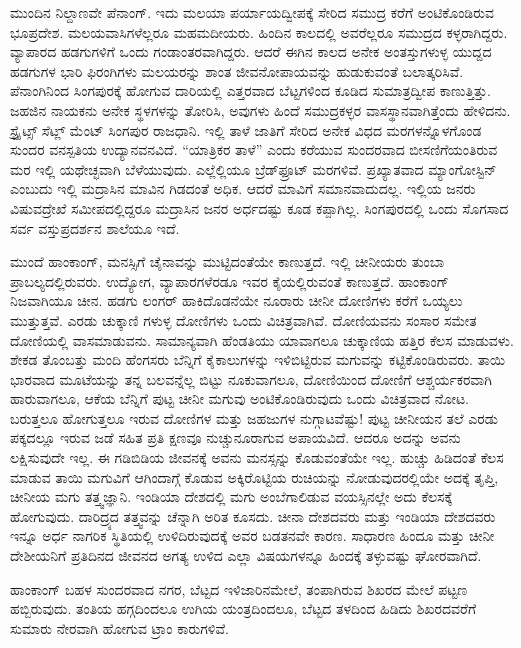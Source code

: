 ಮುಂದಿನ ನಿಲ್ದಾಣವೇ ಪೆನಾಂಗ್. ಇದು ಮಲಯಾ ಪರ್ಯಾಯದ್ವೀಪಕ್ಕೆ ಸೇರಿದ ಸಮುದ್ರ ಕರೆಗೆ ಅಂಟಿಕೊಂಡಿರುವ ಭೂಪ್ರದೇಶ. ಮಲಯವಾಸಿಗಳೆಲ್ಲರೂ ಮಹಮದೀಯರು. ಹಿಂದಿನ ಕಾಲದಲ್ಲಿ ಅವರೆಲ್ಲರೂ ಸಮುದ್ರದ ಕಳ್ಳರಾಗಿದ್ದರು. ವ್ಯಾಪಾರದ ಹಡಗುಗಳಿಗೆ ಒಂದು ಗಂಡಾಂತರವಾಗಿದ್ದರು. ಆದರೆ ಈಗಿನ ಕಾಲದ ಅನೇಕ ಅಂತಸ್ತುಗಳುಳ್ಳ ಯುದ್ದದ ಹಡಗುಗಳ ಭಾರಿ ಫಿರಂಗಿಗಳು ಮಲಯರನ್ನು ಶಾಂತ ಜೀವನೋಪಾಯವನ್ನು ಹುಡುಕುವಂತೆ ಬಲಾತ್ಕರಿಸಿವೆ. ಪೆನಾಂಗಿನಿಂದ ಸಿಂಗಪುರಕ್ಕೆ ಹೋಗುವ ದಾರಿಯಲ್ಲಿ ಎತ್ತರವಾದ ಬೆಟ್ಟಗಳಿಂದ ಕೂಡಿದ ಸುಮಾತ್ರದ್ವೀಪ ಕಾಣುತ್ತಿತ್ತು. ಜಹಜಿನ ನಾಯಕನು ಅನೇಕ ಸ್ಥಳಗಳನ್ನು ತೋರಿಸಿ, ಅವುಗಳು ಹಿಂದೆ ಸಮುದ್ರಕಳ್ಳರ ವಾಸಸ್ಥಾನವಾಗಿತ್ತೆಂದು ಹೇಳಿದನು. ಸ್ಟ್ರೈಟ್ಸ್ ಸೆಟ್ಲ್ ಮೆಂಟ್  ಸಿಂಗಪುರ ರಾಜಧಾನಿ. ಇಲ್ಲಿ ತಾಳೆ ಜಾತಿಗೆ ಸೇರಿದ ಅನೇಕ ವಿಧದ ಮರಗಳನ್ನೊಳಗೊಂಡ ಸುಂದರ ವನಸ್ಪತಿಯ ಉದ್ಯಾನವನವಿದೆ. “ಯಾತ್ರಿಕರ ತಾಳೆ” ಎಂದು ಕರೆಯುವ ಸುಂದರವಾದ ಬೀಸಣಿಗೆಯಂತಿರುವ ಮರ ಇಲ್ಲಿ ಯಥೇಚ್ಛವಾಗಿ ಬೆಳೆಯುವುದು. ಎಲ್ಲೆಲ್ಲಿಯೂ ಬ್ರೆಡ್‌ಫ್ರೂಟ್ ಮರಗಳಿವೆ. ಪ್ರಖ್ಯಾತವಾದ ಮ್ಯಾಂಗೋಸ್ಟಿನ್ ಎಂಬುದು ಇಲ್ಲಿ ಮದ್ರಾಸಿನ ಮಾವಿನ ಗಿಡದಂತೆ ಅಧಿಕ. ಆದರೆ ಮಾವಿಗೆ ಸಮಾನವಾದುದಲ್ಲ. ಇಲ್ಲಿಯ ಜನರು ವಿಷುವದ್ರೇಖೆ ಸಮೀಪದಲ್ಲಿದ್ದರೂ ಮದ್ರಾಸಿನ ಜನರ ಅರ್ಧದಷ್ಟು ಕೂಡ ಕಪ್ಪಾಗಿಲ್ಲ. ಸಿಂಗಪುರದಲ್ಲಿ ಒಂದು ಸೊಗಸಾದ ಸರ್ವ ವಸ್ತುಪ್ರದರ್ಶನ ಶಾಲೆಯೂ ಇದೆ.

ಮುಂದೆ ಹಾಂಕಾಂಗ್, ಮನಸ್ಸಿಗೆ ಚೈನಾವನ್ನು ಮುಟ್ಟಿದಂತೆಯೇ ಕಾಣುತ್ತದೆ. ಇಲ್ಲಿ ಚೀನೀಯರು ತುಂಬಾ ಪ್ರಾಬಲ್ಯದಲ್ಲಿರುವರು. ಉದ್ಯೋಗ, ವ್ಯಾಪಾರಗಳೆರಡೂ ಇವರ ಕೈಯಲ್ಲಿರುವಂತೆ ಕಾಣುತ್ತದೆ. ಹಾಂಕಾಂಗ್ ನಿಜವಾಗಿಯೂ ಚೀನ. ಹಡಗು ಲಂಗರ್‌ ಹಾಕಿದೊಡನೆಯೇ ನೂರಾರು ಚೀನೀ ದೋಣಿಗಳು ಕರೆಗೆ ಒಯ್ಯಲು ಮುತ್ತುತ್ತವೆ. ಎರಡು ಚುಕ್ಕಾಣಿ  ಗಳುಳ್ಳ ದೋಣಿಗಳು ಒಂದು ವಿಚಿತ್ರವಾಗಿವೆ. ದೋಣಿಯವನು ಸಂಸಾರ ಸಮೇತ ದೋಣಿಯಲ್ಲಿ ವಾಸಮಾಡುವನು. ಸಾಮಾನ್ಯವಾಗಿ ಹೆಂಡತಿಯು ಯಾವಾಗಲೂ ಚುಕ್ಕಾಣಿಯ ಹತ್ತಿರ ಕೆಲಸ ಮಾಡುವಳು. ಶೇಕಡ ತೊಂಬತ್ತು ಮಂದಿ ಹೆಂಗಸರು ಬೆನ್ನಿಗೆ ಕೈಕಾಲುಗಳನ್ನು ಇಳಿಬಿಟ್ಟಿರುವ ಮಗುವನ್ನು ಕಟ್ಟಿಕೊಂಡಿರುವರು. ತಾಯಿ ಭಾರವಾದ ಮೂಟೆಯನ್ನು ತನ್ನ ಬಲವನ್ನೆಲ್ಲ ಬಿಟ್ಟು ನೂಕುವಾಗಲೂ, ದೋಣಿಯಿಂದ ದೋಣಿಗೆ ಆಶ್ಚರ್ಯಕರವಾಗಿ ಹಾರುವಾಗಲೂ, ಆಕೆಯ ಬೆನ್ನಿಗೆ ಪುಟ್ಟ ಚೀನೀ ಮಗುವು ಅಂಟಿಕೊಂಡಿರುವುದು ಒಂದು ವಿಚಿತ್ರವಾದ ನೋಟ. ಬರುತ್ತಲೂ ಹೋಗುತ್ತಲೂ ಇರುವ ದೋಣಿಗಳ ಮತ್ತು ಜಹಜುಗಳ ನುಗ್ಗಾಟವೆಷ್ಟು! ಪುಟ್ಟ ಚೀನೀಯನ ತಲೆ ಎರಡು ಪಕ್ಕದಲ್ಲೂ ಇರುವ ಜಡೆ ಸಹಿತ ಪ್ರತಿ ಕ್ಷಣವೂ ನುಚ್ಚುನೂರಾಗುವ ಅಪಾಯವಿದೆ. ಆದರೂ ಅದನ್ನು ಅವನು ಲಕ್ಷಿಸುವುದೇ ಇಲ್ಲ. ಈ ಗಡಿಬಿಡಿಯ ಜೀವನಕ್ಕೆ ಅವನು ಮನಸ್ಸನ್ನು ಕೊಡುವಂತೆಯೇ ಇಲ್ಲ. ಹುಚ್ಚು ಹಿಡಿದಂತೆ ಕೆಲಸ ಮಾಡುವ ತಾಯಿ ಮಗುವಿಗೆ ಆಗಿಂದಾಗ್ಗೆ ಕೊಡುವ ಅಕ್ಕಿರೊಟ್ಟಿಯ ರುಚಿಯನ್ನು ನೋಡುವುದರಲ್ಲಿಯೇ ಅದಕ್ಕೆ ತೃಪ್ತಿ, ಚೀನೀಯ ಮಗು ತತ್ತ್ವಜ್ಞಾನಿ. ಇಂಡಿಯಾ ದೇಶದಲ್ಲಿ ಮಗು ಅಂಬೆಗಾಲಿಡುವ ವಯಸ್ಸಿನಲ್ಲೇ ಅದು ಕೆಲಸಕ್ಕೆ ಹೋಗುವುದು. ದಾರಿದ್ರ್ಯದ ತತ್ತ್ವವನ್ನು ಚೆನ್ನಾಗಿ ಅರಿತ ಕೂಸದು. ಚೀನಾ ದೇಶದವರು ಮತ್ತು ಇಂಡಿಯಾ ದೇಶದವರು ಇನ್ನೂ ಅರ್ಧ ನಾಗರಿಕ ಸ್ಥಿತಿಯಲ್ಲಿ ಉಳಿದಿರುವುದಕ್ಕೆ ಅವರ ಬಡತನವೇ ಕಾರಣ. ಸಾಧಾರಣ ಹಿಂದೂ ಮತ್ತು ಚೀನೀ ದೇಶೀಯನಿಗೆ ಪ್ರತಿದಿನದ ಜೀವನದ ಅಗತ್ಯ ಉಳಿದ ಎಲ್ಲಾ ವಿಷಯಗಳನ್ನೂ ಹಿಂದಕ್ಕೆ ತಳ್ಳುವಷ್ಟು ಘೋರವಾಗಿದೆ.

ಹಾಂಕಾಂಗ್ ಬಹಳ ಸುಂದರವಾದ ನಗರ, ಬೆಟ್ಟದ ಇಳಿಜಾರಿನಮೇಲೆ, ತಂಪಾಗಿರುವ ಶಿಖರದ ಮೇಲೆ ಪಟ್ಟಣ ಹಬ್ಬಿರುವುದು. ತಂತಿಯ ಹಗ್ಗದಿಂದಲೂ ಉಗಿಯ ಯಂತ್ರದಿಂದಲೂ, ಬೆಟ್ಟದ ತಳದಿಂದ ಹಿಡಿದು ಶಿಖರದವರೆಗೆ ಸುಮಾರು ನೇರವಾಗಿ ಹೋಗುವ ಟ್ರಾಂ ಕಾರುಗಳಿವೆ.

